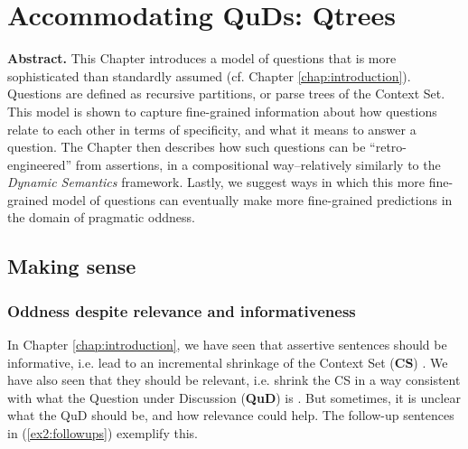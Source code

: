 \chapter{Accommodating QuDs: Qtrees}\label{chap:accommodating-quds}

\textbf{Abstract.} This Chapter introduces a model of questions that is more sophisticated than standardly assumed (cf. Chapter \ref{chap:introduction}). Questions are defined as recursive partitions, or parse trees of the Context Set. This model is shown to capture fine-grained information about how questions relate to each other in terms of specificity, and what it means to answer a question. The Chapter then describes how such questions can be ``retro-engineered'' from assertions, in a compositional way--relatively similarly to the \textit{Dynamic Semantics} framework. Lastly, we suggest ways in which this more fine-grained model of questions can eventually make more fine-grained predictions in the domain of pragmatic oddness. 


\section{Making sense}

\subsection{Oddness despite relevance and informativeness}
In Chapter \ref{chap:introduction}, we have seen that assertive sentences should be informative, i.e. lead to an incremental shrinkage of the Context Set (\textbf{CS}) \citep{Stalnaker1978,Heim1982}. We have also seen that they should be relevant, i.e. shrink the CS in a way consistent with what the Question under Discussion (\textbf{QuD}) is \citep{Lewis1988,Roberts2012}. But sometimes, it is unclear what the QuD should be, and how relevance could help. The follow-up sentences in (\ref{ex2:followups}) exemplify this.

\begin{exe}
	\begin{xlist}
		\label{ex2:hurford-followup}
		\label{ex2:non-red-followup}
		\label{ex2:red-followup}
	\end{xlist} \label{ex2:followups}
\end{exe}

